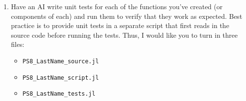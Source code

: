 \documentclass[12pt,english]{article}
\begin{document}
\begin{enumerate}
\item Have an AI write unit tests for each of the functions you've created (or components of each) and run them to verify that they work as expected. Best practice is to provide unit tests in a separate script that first reads in the source code before running the tests. Thus, I would like you to turn in three files:
    \begin{itemize}
        \item \texttt{PS8\_LastName\_source.jl}
        \item \texttt{PS8\_LastName\_script.jl}
        \item \texttt{PS8\_LastName\_tests.jl}
    \end{itemize}

\end{enumerate}
\end{document}
